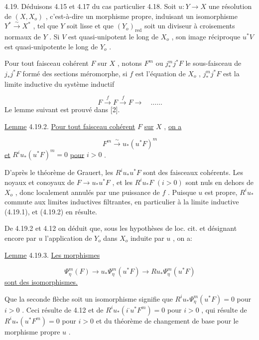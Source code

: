 4.19. Déduisons 4.15 et 4.17 du cas particulier 4.18. Soit $u : Y \longrightarrow X$ une résolution de $(X, X_o)$ , c'est-à-dire un morphisme propre, induisant un isomorphisme $Y^* \stackrel{\sim}{\longrightarrow} X^*$ , tel que $Y$ soit lisse et que $(Y_o)_{\mathrm{red}}$ soit un diviseur à croisements normaux de $Y$ . Si $V$ est quasi-unipotent le long de $X_o$ , son image réciproque $u^*V$ est quasi-unipotente le long de $Y_o$ .

Pour tout faisceau cohérent $F$ sur $X$ , notons $F^m$ ou $j^m_* j^* F$ le sous-faisceau de $j_* j^* F$ formé des sections méromorphe, si $f$ est l'équation de $X_o$ , $j^m_* j^* F$ est la limite inductive du système inductif

\begin{equation}\tag{4.19.1}
F \stackrel{f}{\longrightarrow} F \stackrel{f}{\longrightarrow} F \longrightarrow \quad \ldots\ldots
\end{equation}
Le lemme suivant est prouvé dans [2].

\underline{Lemme} 4.19.2. \underline{Pour tout faisceau cohérent} $F$ \underline{sur} $X$ , \underline{on a}

\begin{equation*}
F^m \stackrel{\sim}{\longrightarrow} u_*(u^* F)^m
\end{equation*}
\underline{et} $R^i u_* (u^* F)^m = 0$ \underline{pour} $i > 0$ .



D'après le théorème de Grauert, les $R^i u_* u^* F$ sont des faisceaux cohérents. Les noyaux et conoyaux de $F \longrightarrow u_* u^* F$ , et les $R^i u_* F$ $(i > 0)$ sont nuls en dehors de $X_o$ , donc localement annulés par une puissance de $f$ . Puisque $u$ est propre, $R^i u_*$ commute aux limites inductives filtrantes, en particulier à la limite inductive (4.19.1), et (4.19.2) en résulte.

De 4.19.2 et 4.12 on déduit que, sous les hypothèses de loc. cit. et désignant encore par $u$ l'application de $Y_o$ dans $X_o$ induite par $u$ , on a:

\underline{Lemme} 4.19.3. \underline{Les morphismes}

\begin{equation*}
\Psi^m_\eta(F) \longrightarrow u_* \Psi^m_\eta(u^* F) \longrightarrow Ru_* \Psi^m_\eta(u^* F)
\end{equation*}
\underline{sont des isomorphismes.}

Que la seconde flèche soit un isomorphisme signifie que $R^i u_* \Psi^m_\eta(u^* F) = 0$ pour $i > 0$ . Ceci résulte de 4.12 et de $R^i u_*(i^{\cdot}u^* F^m) = 0$ pour $i > 0$ , qui résulte de $R^i u_*(u^* F^m) = 0$ pour $i > 0$ et du théorème de changement de base pour le morphisme propre $u$ .

